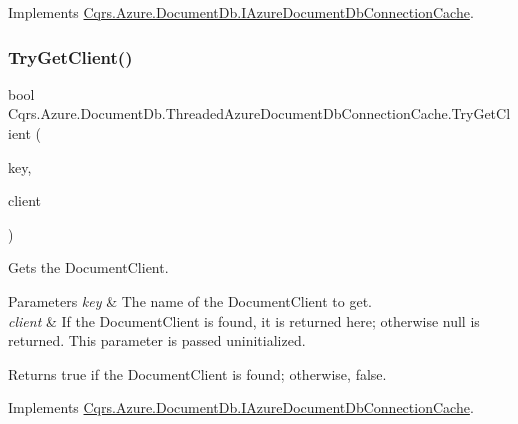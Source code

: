 Implements \hyperlink{interfaceCqrs_1_1Azure_1_1DocumentDb_1_1IAzureDocumentDbConnectionCache_a6f5dab93f2ebee2503eb808b9031777d_a6f5dab93f2ebee2503eb808b9031777d}{Cqrs.\+Azure.\+Document\+Db.\+I\+Azure\+Document\+Db\+Connection\+Cache}.

\mbox{\label{classCqrs_1_1Azure_1_1DocumentDb_1_1ThreadedAzureDocumentDbConnectionCache_a0cf4a79ec6bcc1021182f95ddc27edea_a0cf4a79ec6bcc1021182f95ddc27edea}} 
\subsubsection{\texorpdfstring{Try\+Get\+Client()}{TryGetClient()}}
{\footnotesize\ttfamily bool Cqrs.\+Azure.\+Document\+Db.\+Threaded\+Azure\+Document\+Db\+Connection\+Cache.\+Try\+Get\+Client (\begin{DoxyParamCaption}\item[{string}]{key,  }\item[{out Document\+Client}]{client }\end{DoxyParamCaption})}



Gets the Document\+Client. 


\begin{DoxyParams}{Parameters}
{\em key} & The name of the Document\+Client to get.\\
\hline
{\em client} & If the Document\+Client is found, it is returned here; otherwise null is returned. This parameter is passed uninitialized.\\
\hline
\end{DoxyParams}
\begin{DoxyReturn}{Returns}
true if the Document\+Client is found; otherwise, false.
\end{DoxyReturn}


Implements \hyperlink{interfaceCqrs_1_1Azure_1_1DocumentDb_1_1IAzureDocumentDbConnectionCache_a56a01a4224cb64d9349913e5237cebda_a56a01a4224cb64d9349913e5237cebda}{Cqrs.\+Azure.\+Document\+Db.\+I\+Azure\+Document\+Db\+Connection\+Cache}.

